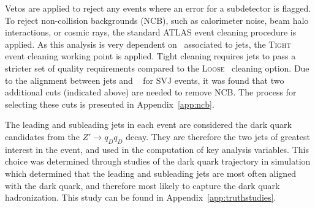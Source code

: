 Vetos are applied to reject any events where an error for a subdetector is flagged. 
To reject non-collision backgrounds (NCB), such as calorimeter noise, beam halo interactions, or cosmic rays, the standard ATLAS event cleaning procedure is applied.
As this analysis is very dependent on \met~associated to jets, the \textsc{Tight}~\cite{tight_loose} event cleaning working point is applied. 
Tight cleaning requires jets to pass a stricter set of quality requirements compared to the \textsc{Loose}~\cite{tight_loose} cleaning option.
Due to the alignment between jets and \met~ for SVJ events, it was found that two additional cuts (indicated above) are needed to remove NCB.
The process for selecting these cuts is presented in Appendix~\ref{app:ncb}. 

The leading and subleading jets in each event are considered the dark quark candidates from the $Z' \rightarrow q_D q_D$ decay.  
They are therefore the two jets of greatest interest in the event, and used in the computation of key analysis variables.
This choice was determined through studies of the dark quark trajectory in simulation which determined that the leading and subleading jets are most often aligned with the dark quark, and therefore most likely to capture the dark quark hadronization.
This study can be found in Appendix~\ref{app:truthstudies}.

